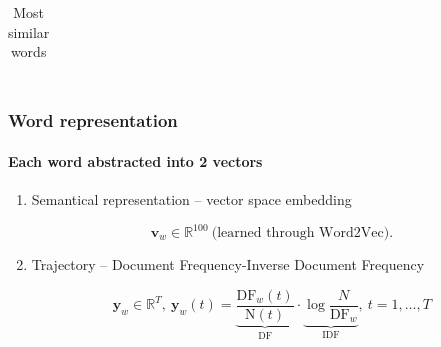 \documentclass{beamer}
\begin{document}
\begin{frame}
\begin{columns}
\begin{column}{0.5\textwidth}
\begin{table}
\begin{tabular}{ c | c}
\end{tabular}
\caption{Most similar words}
\end{table}
\end{column}
\end{columns}

\end{frame}

\begin{frame}
\frametitle{Word representation}
\framesubtitle{Each word abstracted into 2 vectors}

\begin{enumerate}
\item Semantical representation -- vector space embedding

\begin{equation}
\mathbf{v}_{w} \in \mathbb{R}^{100}\ \text{(learned through Word2Vec).}
\end{equation}

\item Trajectory -- Document Frequency-Inverse Document Frequency

\begin{equation}
\mathbf{y}_{w} \in \mathbb{R}^{T},~\mathbf{y}_{w}(t) = \underbrace{\frac{\text{DF}_{w}(t)}{\text{N}(t)}}_{\text{DF}} \cdot \underbrace{\log{\frac{N}{\text{DF}_{w}}}}_{\text{IDF}},\ t = 1, \dots, T
\end{equation}

\end{enumerate}

\end{frame}
\end{document}
